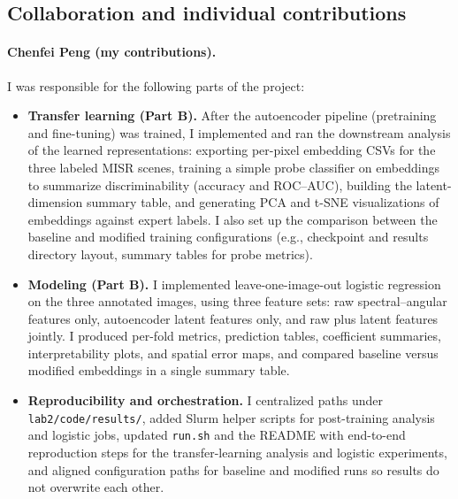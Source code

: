 %   
%

\subsection{Collaboration and individual contributions}

\paragraph{Chenfei Peng (my contributions).}
I was responsible for the following parts of the project:

\begin{itemize}[nosep]
  \item \textbf{Transfer learning (Part B).} After the autoencoder pipeline (pretraining and fine-tuning) was trained, I implemented and ran the downstream analysis of the learned representations: exporting per-pixel embedding CSVs for the three labeled MISR scenes, training a simple probe classifier on embeddings to summarize discriminability (accuracy and ROC--AUC), building the latent-dimension summary table, and generating PCA and t-SNE visualizations of embeddings against expert labels. I also set up the comparison between the baseline and modified training configurations (e.g., checkpoint and results directory layout, summary tables for probe metrics).
  \item \textbf{Modeling (Part B).} I implemented leave-one-image-out logistic regression on the three annotated images, using three feature sets: raw spectral--angular features only, autoencoder latent features only, and raw plus latent features jointly. I produced per-fold metrics, prediction tables, coefficient summaries, interpretability plots, and spatial error maps, and compared baseline versus modified embeddings in a single summary table.
  \item \textbf{Reproducibility and orchestration.} I centralized paths under \texttt{lab2/code/results/}, added Slurm helper scripts for post-training analysis and logistic jobs, updated \texttt{run.sh} and the README with end-to-end reproduction steps for the transfer-learning analysis and logistic experiments, and aligned configuration paths for baseline and modified runs so results do not overwrite each other.
\end{itemize}

